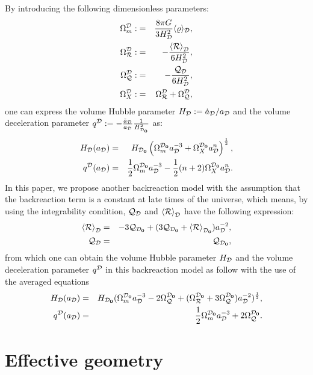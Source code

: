 \documentclass[preprint,preprintnumbers, prd, floatfix,  superscriptaddress,nofootinbib] {revtex4-1}
\newcommand{\CD}{{\cal D}}
\newcommand{\CR}{{\cal R}}
\newcommand{\CQ}{{\cal Q}}
\newcommand{\average}[1]{\left\langle #1 \right\rangle_\CD}
\newcommand{\naverage}[1]{\left\langle #1 \right\rangle_{\CD_{\rm \bf 0}}}
\newcommand{\now}[1]{{#1_{\rm \bf 0}}}
\begin{document}
By introducing the following dimensionless parameters:
\begin{eqnarray}
\Omega_{m}^{\CD} : &=& \frac{8\pi G}{3 H_{\CD}^2} \langle\varrho\rangle_{\cal D} ,\\
\Omega_{\CR}^{\CD} :&=&  - \frac{\average{\CR}}{6 H_{\CD}^2 } ,\\
\Omega_{\CQ}^{\CD} :&=&  - \frac{{\CQ}_{\CD}}{6 H_{\CD}^2 } ,\\
\Omega_X^\CD:&=&\Omega_{\CR}^{\CD} + \Omega_{\CQ}^{\CD} ,
\end{eqnarray}
one can express the volume Hubble parameter $H_\CD : = {\dot a}_\CD / a_\CD$ and the volume deceleration parameter $q^\CD := -\frac{{\ddot a}_\CD}{a_\CD}\frac{1}{H_\now\CD^2}$  as:
\begin{eqnarray}
H_{\CD}(a_{\CD})&=&H_{\now\CD}\left(\Omega_{m}^{\now\CD}a_{\CD}^{-3}+\Omega_{X}^{\now\CD}a_{\CD}^{n}\right)^\frac{1}{2},\\
q^\CD(a_{\CD})&=&\frac{1}{2}\Omega_{m}^{\now\CD}a_{\CD}^{-3}-\frac{1}{2}(n+2)\Omega_{X}^{\now\CD}a_{\CD}^{n}.
\end{eqnarray}
In this paper, we propose another backreaction model with the assumption that the backreaction term is a constant at late times of the universe, which means, by using the integrability condition, ${\cal Q}_\CD$ and $\average{\CR}$ have the following expression:
\begin{eqnarray}
\average{\CR}&=&-3{\cal Q}_{\now\CD}+(3{\cal Q}_{\now\CD}+\naverage{\CR})a_{\CD}^{-2},\\
{\cal Q}_{\CD}&=&{\cal Q}_{\now\CD},
\end{eqnarray}
from which one can obtain the volume Hubble parameter $H_{\CD}$ and the volume deceleration parameter $q^\CD$ in this backreaction model as follow with the use of the averaged equations
\begin{eqnarray}
H_{\CD}(a_{\CD})&=&H_{\now\CD}(\Omega_{m}^{\now\CD}a_{\CD}^{-3}-2\Omega_{\CQ}^{\now\CD}+(\Omega_{\CR}^{\now\CD}+3\Omega_{\CQ}^{\now\CD})a_{\CD}^{-2})^\frac{1}{2},\\
q^\CD(a_{\CD})&=&\frac{1}{2}\Omega_{m}^{\now\CD}a_{\CD}^{-3}+2\Omega_{\CQ}^{\now\CD}.
\end{eqnarray}

\section{Effective geometry}
\label{sec:2}
\end{document}
